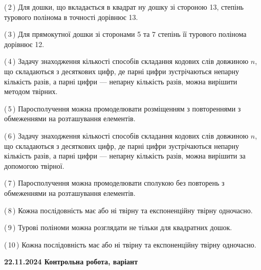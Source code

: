 \documentclass[12pt, ukrainian]{article}
\begin{document}
\begin {large}
\begin {large}
\begin {large}
\begin {large}
\begin {large}
\begin {large}
\begin {large}
\begin {large}
\begin {large}
\begin {large}
\begin {large}
\begin {large}
\begin {large}
\begin {large}
\begin {large}
\begin {large}
\begin {large}
\begin {large}
\begin {large}
\begin {large}
\begin {large}
\begin {large}
\begin {large}
\begin {large}
\begin {large}
\begin {large}
\begin {large}
\begin {large}
\begin {large}
\begin {large}
\begin {large}
\begin {large}
\begin {large}
\begin {large}
\begin {large}
\begin {large}
{(\,2\,) Для дошки, що вкладається в квадрат ну дошку зі стороною 13, степінь турового полінома в точності дорівнює 13.%



(\,3\,) Для прямокутної дошки зі сторонами 5 та 7 степінь її турового полінома дорівнює 12.%



(\,4\,) Задачу знаходження кількості способів складання кодових слів довжиною $n$, що складаються з десяткових цифр, де парні цифри зустрічаються непарну кількість разів, а парні цифри — непарну кількість разів, можна вирішити методом твірних.%



(\,5\,) Паросполучення можна промоделювати розміщенням з повтореннями з обмеженнями на розташування елементів.%



(\,6\,) Задачу знаходження кількості способів складання кодових слів довжиною $n$, що складаються з десяткових цифр, де парні цифри зустрічаються непарну кількість разів, а парні цифри — непарну кількість разів, можна вирішити за допомогою твірної.%



(\,7\,) Паросполучення можна промоделювати сполукою без повторень з обмеженнями на розташування елементів.%



(\,8\,) Кожна послідовність має або ні твірну та експоненційну твірну одночасно.%



(\,9\,) Турові поліноми можна розглядати не тільки для квадратних дошок.%



(\,10\,) Кожна послідовність має або ні твірну та експоненційну твірну одночасно.%




\vspace{5mm}
}
\newpage

\begin {large}

\textbf{22.11.2024 Контрольна робота, варіант  }\par



\end{large}
\end{large}
\end{large}
\end{large}
\end{large}
\end{large}
\end{large}
\end{large}
\end{large}
\end{large}
\end{large}
\end{large}
\end{large}
\end{large}
\end{large}
\end{large}
\end{large}
\end{large}
\end{large}
\end{large}
\end{large}
\end{large}
\end{large}
\end{large}
\end{large}
\end{large}
\end{large}
\end{large}
\end{large}
\end{large}
\end{large}
\end{large}
\end{large}
\end{large}
\end{large}
\end{large}
\end{large}
\end{document}
